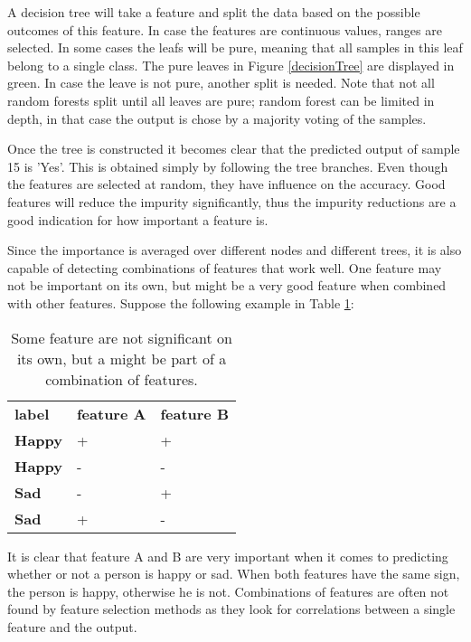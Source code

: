 A decision tree will take a feature and split the data based on the possible outcomes of this feature. In case the features are continuous values, ranges are selected. In some cases the leafs will be pure, meaning that all samples in this leaf belong to a single class. The pure leaves in Figure \ref{decisionTree} are displayed in green. In case the leave is not pure, another split is needed. Note that not all random forests split until all leaves are pure; random forest can be limited in depth, in that case the output is chose by a majority voting of the samples.


\clearpage

Once the tree is constructed it becomes clear that the predicted output of sample 15 is 'Yes'. This is obtained simply by following the tree branches. Even though the features are selected at random, they have influence on the accuracy. Good features will reduce the impurity significantly, thus the impurity reductions are a good indication for how important a feature is.

\npar

Since the importance is averaged over different nodes and different trees, it is also capable of detecting combinations of features that work well. One feature may not be important on its own, but might be a very good feature when combined with other features. Suppose the following example in Table \ref{featPair}:

\begin{table}[H]
\centering
\begin{tabular}{lll}
\textbf{label} & \textbf{feature A} & \textbf{feature B} \\
\textbf{Happy} & +                  & +                  \\
\textbf{Happy} & -                  & -                  \\
\textbf{Sad}   & -                  & +                  \\
\textbf{Sad}   & +                  & -                 
\end{tabular}
\caption{Some feature are not significant on its own, but a might be part of a combination of features.\label{featPair}}
\end{table}

It is clear that feature A and B are very important when it comes to predicting whether or not a person is happy or sad. When both features have the same sign, the person is happy, otherwise he is not. Combinations of features are often not found by feature selection methods as they look for correlations between a single feature and the output.

